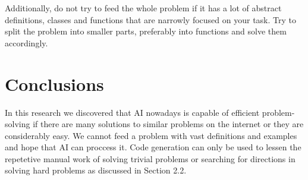\documentclass[12pt]{report}
\begin{document}
		Additionally, do not try to feed the whole problem if it has a lot of abstract definitions, classes and functions that are narrowly focused on your task. Try to split the problem into smaller parts, preferably into functions and solve them accordingly.

	\section{Conclusions}
		\qquad In this research we discovered that AI nowadays is capable of efficient problem-solving if there are many solutions to similar problems on the internet or they are considerably easy. We cannot feed a problem with vast definitions and examples and hope that AI can proccess it. Code generation can only be used to lessen the repetetive manual work of solving trivial problems or searching for directions in solving hard problems as discussed in Section 2.2.
\end{document}
